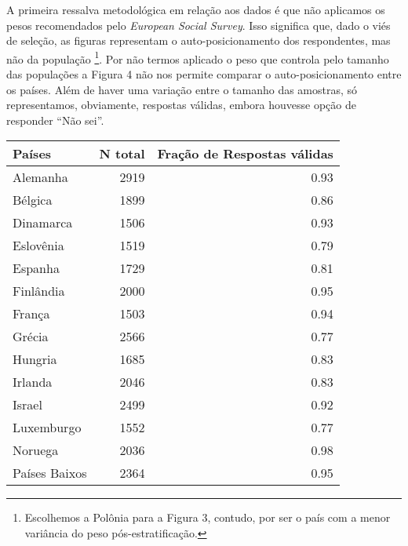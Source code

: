 A primeira ressalva metodológica em relação aos dados é que não aplicamos os
pesos recomendados pelo \textit{European Social Survey}. Isso significa que,
dado o viés de seleção, as figuras representam o auto-posicionamento dos
respondentes, mas não da população \footnote{Escolhemos a Polônia para a Figura
  3, contudo, por ser o país com a menor variância do peso pós-estratificação.}.
Por não termos aplicado o peso que controla pelo tamanho das populações a Figura
4 não nos permite comparar o auto-posicionamento entre os países. Além de haver
uma variação entre o tamanho das amostras, só representamos, obviamente,
respostas válidas, embora houvesse opção de responder ``Não sei''. 



\begin{table}[h]
  \centering
\label{my-label}
\begin{tabular}{|l|r|r|}
\hline
\textbf{Países} & \textbf{N total} & \textbf{Fração  de Respostas  válidas} \\ \hline
Alemanha        & 2919             & 0.93                           \\ \hline
Bélgica         & 1899             & 0.86                           \\ \hline
Dinamarca       & 1506             & 0.93                           \\ \hline
Eslovênia       & 1519             & 0.79                           \\ \hline
Espanha         & 1729             & 0.81                           \\ \hline
Finlândia       & 2000             & 0.95                           \\ \hline
França          & 1503             & 0.94                           \\ \hline
Grécia          & 2566             & 0.77                           \\ \hline
Hungria         & 1685             & 0.83                           \\ \hline
Irlanda         & 2046             & 0.83                           \\ \hline
Israel          & 2499             & 0.92                           \\ \hline
Luxemburgo      & 1552             & 0.77                           \\ \hline
Noruega         & 2036             & 0.98                           \\ \hline
Países Baixos   & 2364             & 0.95                           \\ \hline

\end{tabular}
\end{table}
